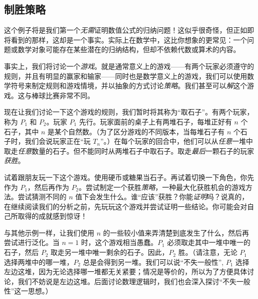 \subsection{制胜策略}

这个例子将是我们第一个\emph{无需}证明数值公式的归纳问题！这似乎很奇怪，但正如即将看到的那样，这却是一个事实。实际上在数学中，这比你想象的更常见：一个问题或数学对象可能存在某些潜在的归纳结构，但却不依赖代数或算术的内容。

事实上，我们将讨论一个\emph{游戏}。就是通常意义上的游戏——有两个玩家必须遵守的规则，并且有明显的赢家和输家——同时也是数学意义上的游戏，我们可以使用数学符号来制定规则和游戏情境，并以抽象的方式讨论\emph{策略}。我们甚至可以\emph{解}这个游戏。这与棒球比赛非常不同。

现在让我们讨论一下这个游戏的规则，我们暂时将其称为``取石子''。有两个玩家，称为 $P_1$ 和 $P_2$。玩家 $P_1$ 先行。玩家面前的桌子上有两堆石子，每堆正好有 $n$ 个石子，其中 $n$ 是某个自然数。（为了区分游戏的不同版本，当每堆石子有 $n$ 个石子时，我们会说玩家正在``玩 $T_n$''。）在每个玩家的回合中，他们可以从\emph{任意}一堆中取走\emph{任意}数量的石子。但不能同时从两堆石子中取石子。取走\emph{最后}一颗石子的玩家\emph{获胜}。

试着跟朋友玩一下这个游戏。使用硬币或糖果当石子。再试着切换一下角色，你先作为 $P_1$，然后再作为 $P_2$。尝试制定一个获胜\emph{策略}，一种最大化获胜机会的游戏方法。尝试猜测不同的 $n$ 值下会发生什么。谁``应该''获胜？你能\emph{证明}吗？说真的，在继续阅读我们的分析之前，先玩玩这个游戏并尝试证明一些结论。你可能会对自己所取得的成就感到惊讶！

与其他示例一样，让我们使用 $n$ 的一些较小值来弄清楚到底发生了什么，然后再尝试进行泛化。当 $n = 1$ 时，这个游戏相当愚蠢。$P_1$ 必须取走其中一堆中唯一的石子，然后 $P_2$ 取走另一堆中唯一剩余的石子。因此，$P_2$ 胜。（请注意，无论 $P_1$ 选择两堆中的哪一堆，$P_2$ 总是会得到另一堆。我们可以说``不失一般性'', $P_1$ 选择左边这堆，因为无论选择哪一堆都无关紧要；情况是等价的，所以为了方便具体讨论，我们不妨说是左边这堆。后面讨论数理逻辑时，我们也会深入探讨``不失一般性''这一思想。）


\begin{center}
\end{center}


